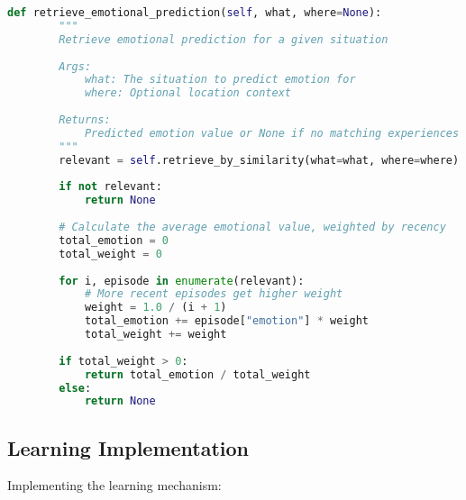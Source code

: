\documentclass[11pt,a4paper]{article}
\begin{document}
\begin{lstlisting}[language=Python]
    def retrieve_emotional_prediction(self, what, where=None):
        """
        Retrieve emotional prediction for a given situation
        
        Args:
            what: The situation to predict emotion for
            where: Optional location context
            
        Returns:
            Predicted emotion value or None if no matching experiences
        """
        relevant = self.retrieve_by_similarity(what=what, where=where)
        
        if not relevant:
            return None
            
        # Calculate the average emotional value, weighted by recency
        total_emotion = 0
        total_weight = 0
        
        for i, episode in enumerate(relevant):
            # More recent episodes get higher weight
            weight = 1.0 / (i + 1)
            total_emotion += episode["emotion"] * weight
            total_weight += weight
            
        if total_weight > 0:
            return total_emotion / total_weight
        else:
            return None
\end{lstlisting}

\subsection{Learning Implementation}
Implementing the learning mechanism:
\end{document}
